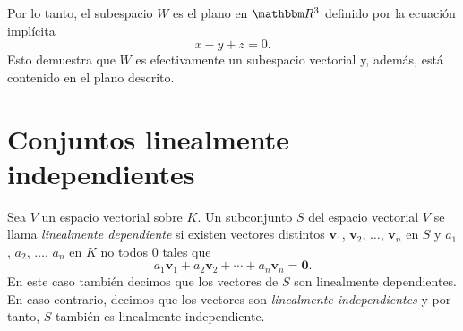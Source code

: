 \begin{examplebox}{}{}
\begin{center}
        \captionsetup*[figure]{hypcap=false}%
    \end{center}
    Por lo tanto, el subespacio $W$ es el plano en $\RR[3]$ definido por la ecuación implícita
    $$x - y + z = 0.$$
    Esto demuestra que $W$ es efectivamente un subespacio vectorial y, además, está contenido en el plano descrito.
\end{examplebox}

\newpage

\section{Conjuntos linealmente independientes}

\begin{definicion}{}{}
    Sea $V$ un espacio vectorial sobre $K$. Un subconjunto $S$ del espacio vectorial $V$ se llama \emph{linealmente dependiente} si existen vectores distintos $\mathbf{v}_1$, $\mathbf{v}_2$, $\dots$, $\mathbf{v}_n$ en $S$ y $a_1$, $a_2$, $\dots$, $a_n$ en $K$ no todos $0$ tales que
    $$a_1 \mathbf{v}_1 + a_2 \mathbf{v}_2 + \cdots + a_n \mathbf{v}_n = \mathbf{0}.$$
    En este caso también decimos que los vectores de $S$ son linealmente dependientes. En caso contrario, decimos que los vectores son \emph{linealmente independientes} y por tanto, $S$ también es linealmente independiente.
\end{definicion}

